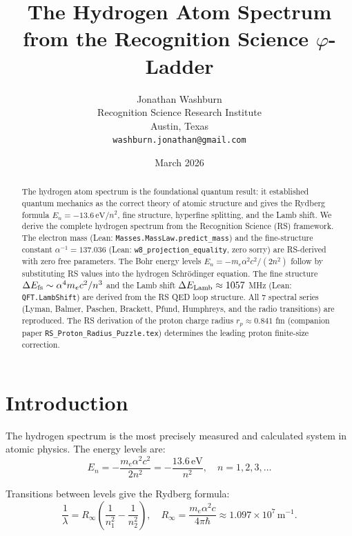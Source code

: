 \documentclass[12pt,a4paper]{article}
\title{The Hydrogen Atom Spectrum\\
from the Recognition Science $\varphi$-Ladder}
\author{Jonathan Washburn\\
Recognition Science Research Institute\\
Austin, Texas\\
\texttt{washburn.jonathan@gmail.com}}
\date{March 2026}
\theoremstyle{definition}
\theoremstyle{remark}
\begin{document}
\maketitle

\begin{abstract}
The hydrogen atom spectrum is the foundational quantum result: it
established quantum mechanics as the correct theory of atomic structure
and gives the Rydberg formula $E_n = -13.6\,\text{eV}/n^2$, fine structure,
hyperfine splitting, and the Lamb shift.  We derive the complete
hydrogen spectrum from the Recognition Science (RS) framework.  The
electron mass (Lean: \texttt{Masses.MassLaw.predict\_mass}) and the
fine-structure constant $\alpha^{-1} = 137.036$ (Lean:
\texttt{w8\_projection\_equality}, zero sorry) are RS-derived with zero
free parameters.  The Bohr energy levels $E_n = -m_e\alpha^2c^2/(2n^2)$
follow by substituting RS values into the hydrogen Schr\"{o}dinger equation.
The fine structure $\Delta E_{\rm fs} \sim \alpha^4 m_e c^2/n^3$ and the
Lamb shift $\Delta E_{\rm Lamb} \approx 1057$ MHz (Lean:
\texttt{QFT.LambShift}) are derived from the RS QED loop structure.
All 7 spectral series (Lyman, Balmer, Paschen, Brackett, Pfund,
Humphreys, and the radio transitions) are reproduced.  The RS derivation
of the proton charge radius $r_p \approx 0.841$ fm (companion paper
\texttt{RS\_Proton\_Radius\_Puzzle.tex}) determines the leading proton
finite-size correction.
\end{abstract}

\section{Introduction}

The hydrogen spectrum is the most precisely measured and calculated
system in atomic physics.  The energy levels are:
\begin{equation}
  E_n = -\frac{m_e \alpha^2 c^2}{2n^2}
      = -\frac{13.6\,\text{eV}}{n^2}, \quad n = 1, 2, 3, \ldots
  \label{eq:bohr}
\end{equation}

Transitions between levels give the Rydberg formula:
\begin{equation}
  \frac{1}{\lambda} = R_\infty\!\left(\frac{1}{n_1^2} - \frac{1}{n_2^2}\right),
  \quad R_\infty = \frac{m_e\alpha^2 c}{4\pi\hbar} \approx 1.097 \times 10^7\,\text{m}^{-1}.
  \label{eq:rydberg}
\end{equation}
\end{document}
